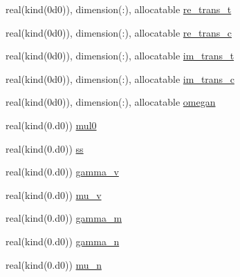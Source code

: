 \begin{Indent}
\begin{DoxyCompactItemize}
\item 
real(kind(0d0)), dimension(\+:), allocatable \hyperlink{namespacem__global__parameters_ae0e61a10cd5b33db394052fbefee2681}{re\+\_\+trans\+\_\+t}
\item 
real(kind(0d0)), dimension(\+:), allocatable \hyperlink{namespacem__global__parameters_a666c8f5f6663ab81f55c2298e642a3a9}{re\+\_\+trans\+\_\+c}
\item 
real(kind(0d0)), dimension(\+:), allocatable \hyperlink{namespacem__global__parameters_a62b213889b2dc5da7d81e7fa636231f6}{im\+\_\+trans\+\_\+t}
\item 
real(kind(0d0)), dimension(\+:), allocatable \hyperlink{namespacem__global__parameters_aa93addd83f0134aaaf319ca2b743233c}{im\+\_\+trans\+\_\+c}
\item 
real(kind(0d0)), dimension(\+:), allocatable \hyperlink{namespacem__global__parameters_ae152b49c742928bc52f6da61dd805693}{omegan}
\item 
real(kind(0.d0)) \hyperlink{namespacem__global__parameters_ad7bef3ef71a8dfe1ce24000cff0eff8d}{mul0}
\item 
real(kind(0.d0)) \hyperlink{namespacem__global__parameters_ab2260b0199f0043981fba75890dbff3d}{ss}
\item 
real(kind(0.d0)) \hyperlink{namespacem__global__parameters_a9a7da412ab2c84481f1c2bb636e83e10}{gamma\+\_\+v}
\item 
real(kind(0.d0)) \hyperlink{namespacem__global__parameters_a2224d20370b84925128e1b1bbae8e8df}{mu\+\_\+v}
\item 
real(kind(0.d0)) \hyperlink{namespacem__global__parameters_adfa6a4a17c338d84a6d6ad5a0b9412de}{gamma\+\_\+m}
\item 
real(kind(0.d0)) \hyperlink{namespacem__global__parameters_ad507a6f681cefe17e49f283d47a7c0ad}{gamma\+\_\+n}
\item 
real(kind(0.d0)) \hyperlink{namespacem__global__parameters_a7829126e47034f2e39153efa144bc17b}{mu\+\_\+n}
\end{DoxyCompactItemize}
\end{Indent}
